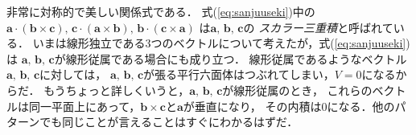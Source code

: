 非常に対称的で美しい関係式である．
式(\ref{eq:sanjuuseki})中の \\
$\bm{a} \cdot ( \bm{b} \times \bm{c} ) , \, 
\bm{c} \cdot ( \bm{a} \times \bm{b}) , \, 
\bm{b} \cdot ( \bm{c} \times \bm{a} ) $
は$\bm{a}, \, \bm{b}, \, \bm{c}$の
\emph{スカラー三重積}と呼ばれている．
いまは線形独立である3つのベクトルについて考えたが，式(\ref{eq:sanjuuseki})は
$\bm{a}, \, \bm{b}, \, \bm{c}$が線形従属である場合にも成り立つ．
線形従属であるようなベクトル$\bm{a}, \, \bm{b}, \, \bm{c}$に対しては，
$\bm{a}, \, \bm{b}, \, \bm{c}$が張る平行六面体はつぶれてしまい，$V=0$になるからだ．
もうちょっと詳しくいうと，$\bm{a}, \, \bm{b}, \, \bm{c}$が線形従属のとき，
これらのベクトルは同一平面上にあって，$ \bm{b} \times \bm{c} $と$\bm{a}$が垂直になり，
その内積は0になる．他のパターンでも同じことが言えることはすぐにわかるはずだ．

